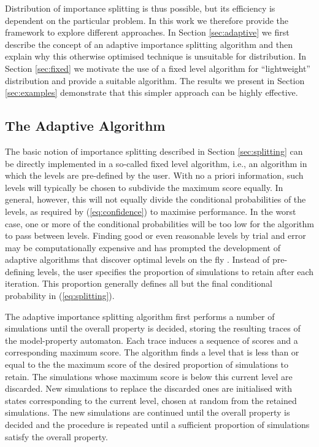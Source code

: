 \documentclass{llncs}
\begin{document}
Distribution of importance splitting is thus possible, but its efficiency
is dependent on the particular problem. In this work we therefore
provide the framework to explore different approaches. In Section
\ref{sec:adaptive} we first describe the concept of an adaptive importance
splitting algorithm and then explain why this otherwise optimised
technique is unsuitable for distribution. In Section \ref{sec:fixed}
we motivate the use of a fixed level algorithm for ``lightweight''
distribution and provide a suitable algorithm. The results we present
in Section \ref{sec:examples} demonstrate that this simpler approach
can be highly effective.


\subsection{The Adaptive Algorithm\label{sec:adaptive}}

The basic notion of importance splitting described in Section \ref{sec:splitting}
can be directly implemented in a so-called fixed level algorithm,
i.e., an algorithm in which the levels are pre-defined by the user.
With no a priori information, such levels will typically be chosen
to subdivide the maximum score equally. In general, however, this
will not equally divide the conditional probabilities of the levels,
as required by (\ref{eq:confidence}) to maximise performance. In
the worst case, one or more of the conditional probabilities will
be too low for the algorithm to pass between levels. Finding good
or even reasonable levels by trial and error may be computationally
expensive and has prompted the development of adaptive algorithms
that discover optimal levels on the fly \cite{CerouGuyader2007,JegourelLegaySedwards2013,JegourelLegaySedwards2014}.
Instead of pre-defining levels, the user specifies the proportion
of simulations to retain after each iteration. This proportion generally
defines all but the final conditional probability in (\ref{eq:splitting}).

The adaptive importance splitting algorithm first performs a number
of simulations until the overall property is decided, storing the
resulting traces of the model-property automaton. Each trace induces
a sequence of scores and a corresponding maximum score. The algorithm
finds a level that is less than or equal to the the maximum score
of the desired proportion of simulations to retain. The simulations
whose maximum score is below this current level are discarded. New
simulations to replace the discarded ones are initialised with states
corresponding to the current level, chosen at random from the retained
simulations. The new simulations are continued until the overall property
is decided and the procedure is repeated until a sufficient proportion
of simulations satisfy the overall property.
\end{document}
